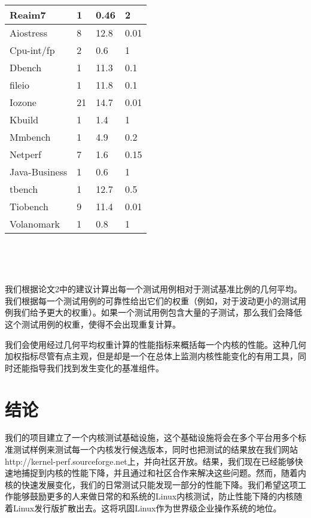 {
\center
{}
\tabletail{\hline}

\begin{supertabular}{|p{2.5cm}|p{2.5cm}|p{2.5cm}|p{2.5cm}|}
\hline
Reaim7 & 1 & 0.46 & 2\\
\hline
Aiostress & 8 & 12.8 & 0.01\\
\hline
Cpu-int/fp & 2 & 0.6 & 1\\
\hline 
Dbench & 1 & 11.3 & 0.1\\
\hline
fileio & 1 & 11.8 & 0.1\\
\hline
Iozone & 21 & 14.7 & 0.01\\
\hline
Kbuild & 1 & 1.4 & 1\\
\hline
Mmbench & 1 & 4.9 & 0.2\\
\hline
Netperf & 7 & 1.6 & 0.15\\
\hline
Java-Business & 1 & 0.6 & 1\\
\hline
tbench & 1 & 12.7 & 0.5\\
\hline
Tiobench & 9 & 11.4 & 0.01\\
\hline
Volanomark & 1 & 0.8 &1\\
\end{supertabular}
\ 

}

\ 

我们根据论文2中的建议计算出每一个测试用例相对于测试基准比例的几何平均。我们根据每一个测试用例的可靠性给出它们的权重（例如，对于波动更小的测试用例我们给予更大的权重）。如果一个测试用例包含大量的子测试，那么我们会降低这个测试用例的权重，使得不会出现重复计算。


我们会使用经过几何平均权重计算的性能指标来概括每一个内核的性能。这种几何加权指标尽管有点主观，但是却是一个在总体上监测内核性能变化的有用工具，同时还能指导我们找到发生变化的基准组件。

\section{结论}
我们的项目建立了一个内核测试基础设施，这个基础设施将会在多个平台用多个标准测试样例来测试每一个内核发行候选版本，同时也把测试的结果放在我们网站http://kernel-perf.sourceforge.net上，并向社区开放。结果，我们现在已经能够快速地捕捉到内核的性能下降，并且通过和社区合作来解决这些问题。然而，随着内核的快速发展变化，我们的日常测试只能发现一部分的性能下降。我们希望这项工作能够鼓励更多的人来做日常的和系统的Linux内核测试，防止性能下降的内核随着Linux发行版扩散出去。这将巩固Linux作为世界级企业操作系统的地位。
